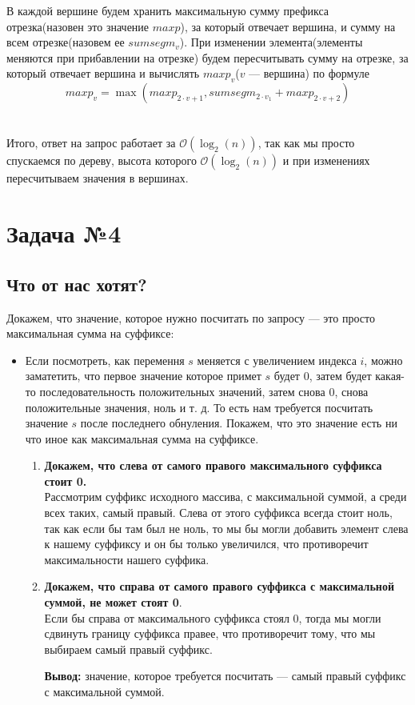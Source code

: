 \documentclass{article}
\begin{document}
\begin{enumerate}
	
	В каждой вершине будем хранить максимальную сумму префикса отрезка(назовен это значение $maxp$), за который отвечает вершина, и сумму на всем отрезке(назовем ее $sumsegm_v$). 
	При изменении элемента(элементы меняются при прибавлении на отрезке) будем пересчитывать сумму на отрезке, за который отвечает вершина и вычислять $maxp_v$($v$ --- вершина) по формуле
	$$maxp_v = \max(maxp_{2\cdot v + 1}, sumsegm_{2\cdot v _ 1} + maxp_{2\cdot v + 2})$$
	\\\\
	Итого, ответ на запрос работает за $\mathcal{O}(\log_{2}(n))$, так как мы просто спускаемся по дереву, высота которого $\mathcal{O}(\log_{2}(n))$ и при изменениях пересчитываем значения в вершинах.
	
\end{enumerate}

\section*{Задача №4}
\subsection*{Что от нас хотят?}
Докажем, что значение, которое нужно посчитать по запросу --- это просто максимальная сумма на суффиксе:
\begin{itemize}
	\item Если посмотреть, как перемення $s$ меняется с увеличением индекса $i$, можно заматетить, что первое значение которое примет $s$ будет $0$, затем будет какая-то последовательность положительных значений, затем снова $0$, снова положительные значения, ноль и т. д. То есть нам требуется посчитать значение $s$ после последнего обнуления. Покажем, что это значение есть ни что иное как максимальная сумма на суффиксе.
	\begin{enumerate}
		\item \textbf{Докажем, что слева от самого правого максимального суффикса стоит 0.}\\
		Рассмотрим суффикс исходного массива, с максимальной суммой, а среди всех таких, самый правый. Слева от этого суффикса всегда стоит ноль, так как если бы там был не ноль, то мы бы могли добавить элемент слева к нашему суффиксу и он бы только увеличился, что противоречит максимальности нашего суффика. 
		\item \textbf{Докажем, что справа от самого правого суффикса с максимальной суммой, не может стоят 0}.\\
		Если бы справа от максимального суффикса стоял 0, тогда мы могли сдвинуть границу суффикса правее, что противоречит тому, что мы выбираем самый правый суффикс.
		
		\item[\textbf{Вывод:}] значение, которое требуется посчитать --- самый правый суффикс с максимальной суммой.
	\end{enumerate}
	
\end{itemize}
\end{document}
